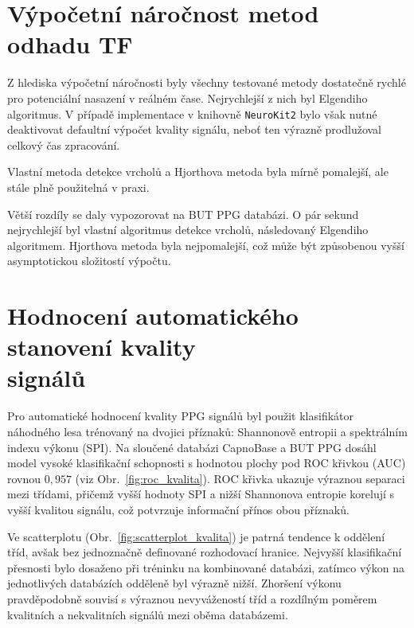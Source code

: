\section{Výpočetní náročnost metod odhadu TF}
Z hlediska výpočetní náročnosti byly všechny testované metody dostatečně rychlé pro potenciální nasazení v reálném čase.
Nejrychlejší z nich byl Elgendiho algoritmus.
V případě implementace v knihovně \texttt{NeuroKit2} bylo však nutné deaktivovat defaultní výpočet kvality signálu, neboť ten výrazně prodlužoval celkový čas zpracování.

Vlastní metoda detekce vrcholů a Hjorthova metoda byla mírně pomalejší, ale stále plně použitelná v praxi.

Větší rozdíly se daly vypozorovat na \acs{BUT PPG} databázi.
O pár sekund nejrychlejší byl vlastní algoritmus detekce vrcholů, následovaný Elgendiho algoritmem.
Hjorthova metoda byla nejpomalejší, což může být způsobenou vyšší asymptotickou složitostí výpočtu.

\section[Hodnocení automatického stanovení kvality signálů]{Hodnocení automatického stanovení kvality\\signálů}
Pro automatické hodnocení kvality \acs{PPG} signálů byl použit klasifikátor náhodného lesa trénovaný na dvojici příznaků: Shannonově entropii a spektrálním indexu výkonu (\acs{SPI}).
Na sloučené databázi CapnoBase a BUT PPG dosáhl model vysoké klasifikační schopnosti s hodnotou plochy pod ROC křivkou (\acs{AUC}) rovnou $0,957$ (viz Obr.~\ref{fig:roc_kvalita}).
ROC křivka ukazuje výraznou separaci mezi třídami, přičemž vyšší hodnoty \acs{SPI} a nižší Shannonova entropie korelují s vyšší kvalitou signálu, což potvrzuje informační přínos obou příznaků.

Ve scatterplotu (Obr.~\ref{fig:scatterplot_kvalita}) je patrná tendence k oddělení tříd, avšak bez jednoznačně definované rozhodovací hranice.
Nejvyšší klasifikační přesnosti bylo dosaženo při tréninku na kombinované databázi, zatímco výkon na jednotlivých databázích odděleně byl výrazně nižší.
Zhoršení výkonu pravděpodobně souvisí s výraznou nevyvážeností tříd a rozdílným poměrem kvalitních a nekvalitních signálů mezi oběma databázemi.

